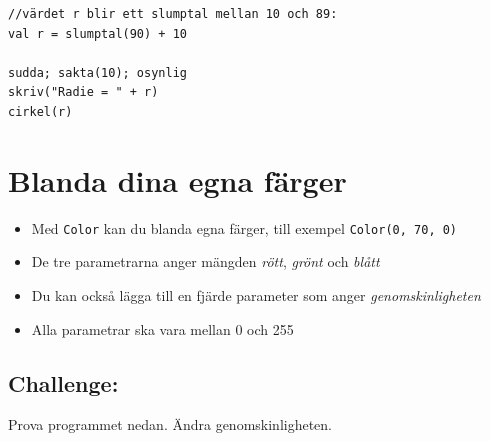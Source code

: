   

\begin{lstlisting}[basicstyle={\ttfamily\fontsize{20}{24}\selectfont},numbers=none]
//värdet r blir ett slumptal mellan 10 och 89:
val r = slumptal(90) + 10   

sudda; sakta(10); osynlig
skriv("Radie = " + r)
cirkel(r)
\end{lstlisting}
        
\chapter{Blanda dina egna färger}

\begin{itemize}

\item {Med \lstinline{Color} kan du blanda egna färger, till exempel \lstinline{Color(0, 70, 0)}}
\item {De tre parametrarna anger mängden {\it rött}, {\it grönt} och {\it blått}}
\item {Du kan också lägga till en fjärde parameter som anger {\it genomskinligheten}}
\item {Alla parametrar ska vara mellan 0 och 255}

\end{itemize}


\section*{\color{BrickRed}Challenge:}
Prova programmet nedan. Ändra genomskinligheten.

